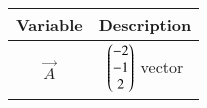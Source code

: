 \begin{tabular}[12pt]{ |c| c|}
    \hline
    \textbf{Variable} & \textbf{Description}\\ 
    \hline
	$\vec{A}$ & $\begin{pmatrix}-2\\-1\\2\end{pmatrix}$ vector\\
   \hline
    \end{tabular}
